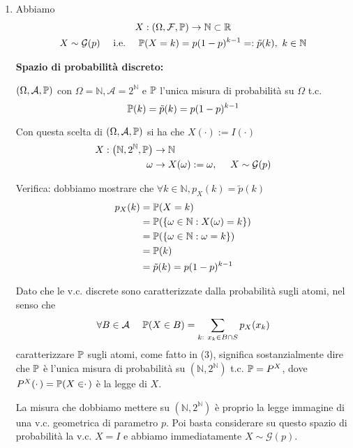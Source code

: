 \begin{enumerate}
\item Abbiamo\begin{gather*}
X:( \Omega ,\mathcal{F} ,\mathbb{P})\rightarrow \mathbb{N} \subset \mathbb{R}\\
X\sim \mathcal{G}( p) \ \ \ \ \text{i.e.} \ \ \ \ \mathbb{P}( X=k) =p( 1-p)^{k-1} =:\tilde{p}( k) ,\ k\in \mathbb{N}
\end{gather*}

\textbf{Spazio di probabilità discreto:}

$( \Omega ,\mathcal{A} ,\mathbb{P})$ con $\Omega =\mathbb{N} ,\mathcal{A} =2^{\mathbb{N}}$ e $\mathbb{P}$ l'unica misura di probabilità su $\Omega $ t.c.\begin{equation}
\mathbb{P}( k) =\tilde{p}( k) =p( 1-p)^{k-1}
\end{equation}

Con questa scelta di $( \Omega ,\mathcal{A} ,\mathbb{P})$ si ha che $X( \cdotp ) :=I( \cdotp )$\begin{align*}
X:\left(\mathbb{N} ,2^{\mathbb{N}} ,\mathbb{P}\right) & \rightarrow \mathbb{N}\\
\omega  & \rightarrow X( \omega ) :=\omega ,\ \ \ \ X\sim \mathcal{G}( p)
\end{align*}

Verifica: dobbiamo mostrare che $\forall k\in \mathbb{N} ,p_{X}( k) =\tilde{p}( k)$\begin{align*}
p_{X}( k) & =\mathbb{P}( X=k)\\
 & =\mathbb{P}(\{\omega \in \mathbb{N} :X( \omega ) =k\})\\
 & =\mathbb{P}(\{\omega \in \mathbb{N} :\omega =k\})\\
 & =\mathbb{P}( k)\\
 & =\tilde{p}( k) =p( 1-p)^{k-1}
\end{align*}

\begin{oss}
Dato che le v.c. discrete sono caratterizzate dalla probabilità sugli atomi, nel senso che
\begin{equation*}
\forall B\in \mathcal{A} \ \ \ \ \mathbb{P}( X\in B) =\sum\limits _{k:\ x_{k} \in B\cap S} p_{X}( x_{k})
\end{equation*}
caratterizzare $\mathbb{P}$ sugli atomi, come fatto in (3), significa sostanzialmente dire che $\mathbb{P}$ è l'unica misura di probabilità su $\left(\mathbb{N} ,2^{\mathbb{N}}\right)$ t.c. $\mathbb{P} =P^{X}$, dove $P^{X}( \cdotp ) =\mathbb{P}( X\in \cdotp )$ è la legge di $X$.

La misura che dobbiamo mettere su $\left(\mathbb{N} ,2^{\mathbb{N}}\right)$ è proprio la legge immagine di una v.c. geometrica di parametro $p$. Poi basta considerare su questo spazio di probabilità la v.c. $X=I$ e abbiamo immediatamente $X\sim \mathcal{G}( p)$.
\end{oss}


\end{enumerate}
